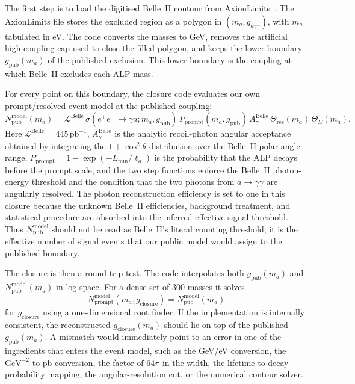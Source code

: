 \documentclass[12pt,a4paper]{article}
\newcommand{\gagg}{g_{a\gamma\gamma}}
\newcommand{\Lint}{\mathcal{L}}
\newcommand{\pbinv}{\,\text{pb}^{-1}}
\begin{document}
The first step is to load the digitised Belle~II contour from
AxionLimits~\cite{AxionLimits}. The AxionLimits file stores the excluded region
as a polygon in $(m_a,\gagg)$, with $m_a$ tabulated in eV.
The code converts the masses to GeV, removes the artificial high-coupling cap
used to close the filled polygon, and keeps the lower boundary
$g_\mathrm{pub}(m_a)$ of the published exclusion.
This lower boundary is the coupling at which Belle~II excludes each ALP mass.

For every point on this boundary, the closure code evaluates our own
prompt/resolved event model at the published coupling:
\begin{equation}
    N_\mathrm{pub}^\mathrm{model}(m_a)
    =
    \Lint^\mathrm{Belle}
    \,
    \sigma(e^+e^-\to\gamma a; m_a,g_\mathrm{pub})
    \,
    P_\mathrm{prompt}(m_a,g_\mathrm{pub})
    \,
    A_\gamma^\mathrm{Belle}
    \,
    \Theta_\mathrm{res}(m_a)
    \,
    \Theta_E(m_a).
    \label{eq:belle2_closure_neff}
\end{equation}
Here $\Lint^\mathrm{Belle}=445\pbinv$,
$A_\gamma^\mathrm{Belle}$ is the analytic recoil-photon angular acceptance
obtained by integrating the $1+\cos^2\theta$ distribution over the Belle~II
polar-angle range, $P_\mathrm{prompt}=1-\exp(-L_\mathrm{min}/\ell_a)$ is the
probability that the ALP decays before the prompt scale, and the two step
functions enforce the Belle~II photon-energy threshold and the condition that
the two photons from $a\to\gamma\gamma$ are angularly resolved.
The photon reconstruction efficiency is set to one in this closure because the
unknown Belle~II efficiencies, background treatment, and statistical procedure
are absorbed into the inferred effective signal threshold.
Thus $N_\mathrm{pub}^\mathrm{model}$ should not be read as Belle~II's literal
counting threshold; it is the effective number of signal events that our public
model would assign to the published boundary.

The closure is then a round-trip test.
The code interpolates both $g_\mathrm{pub}(m_a)$ and
$N_\mathrm{pub}^\mathrm{model}(m_a)$ in log space.
For a dense set of 300 masses it solves
\begin{equation}
    N_\mathrm{prompt}^\mathrm{model}(m_a,g_\mathrm{closure})
    =
    N_\mathrm{pub}^\mathrm{model}(m_a)
    \label{eq:belle2_closure_root}
\end{equation}
for $g_\mathrm{closure}$ using a one-dimensional root finder.
If the implementation is internally consistent, the reconstructed
$g_\mathrm{closure}(m_a)$ should lie on top of the published
$g_\mathrm{pub}(m_a)$.
A mismatch would immediately point to an error in one of the ingredients that
enters the event model, such as the GeV/eV conversion, the $\mathrm{GeV}^{-2}$
to pb conversion, the factor of $64\pi$ in the width, the lifetime-to-decay
probability mapping, the angular-resolution cut, or the numerical contour
solver.
\end{document}
